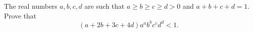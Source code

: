 The real numbers $a, b, c, d$
are such that $a\geq b\geq c\geq d>0$ and $a+b+c+d=1$.
Prove that
\[ (a+2b+3c+4d) a^a b^b c^c d^d < 1. \]